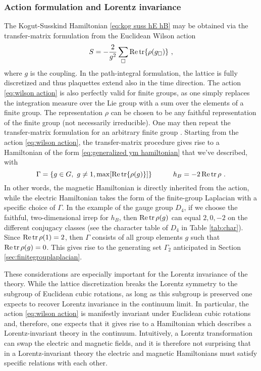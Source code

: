 \subsubsection{Action formulation and Lorentz invariance}\label{sec:action formulation}

The Kogut-Susskind Hamiltonian \eqref{eq:kog suss hE hB} may be obtained via the transfer-matrix formulation from the Euclidean Wilson action \cite{creutz1977transfermatrix,kogut1979introduction}
\begin{equation}
    \label{eq:wilson action}
    S = -\frac{2}{g^2} \sum_{\square} \Re \tr{\rho(g_\square)} \ ,
\end{equation}
where $g$ is the coupling.
In the path-integral formulation, the lattice is fully discretized and thus plaquettes extend also in the time direction.
The action \eqref{eq:wilson action} is also perfectly valid for finite groups, as one simply replaces the integration measure over the Lie group with a sum over the elements of a finite group. The representation $\rho$ can be chosen to be any faithful representation of the finite group (not necessarily irreducible).
One may then repeat the transfer-matrix formulation for an arbitrary finite group \cite{harlow2018quantum}.
Starting from the action \eqref{eq:wilson action}, the transfer-matrix procedure gives rise to a Hamiltonian of the form \eqref{eq:generalized ym hamiltonian} that we've described, with
\begin{equation}
    \label{eq:lorentz invariance relations}
    \Gamma = \{g \in G,\,\, g \neq 1, \mathrm{max} \bqty{\Re \tr{\rho(g)}}  \} \quad \quad \quad h_B=-2\Re\tr\rho \ .
\end{equation}
In other words, the magnetic Hamiltonian is directly inherited from the action, while the electric Hamiltonian takes the form of the finite-group Laplacian with a specific choice of $\Gamma$. In the example of the gauge group $D_4$, if we choose the faithful, two-dimensional irrep for $h_B$, then $\Re\tr\rho(g)$ can equal $2, 0, -2$ on the different conjugacy classes (see the character table of $D_4$ in Table \ref{tab:char}). Since $\Re\tr\rho(1)=2$, then $\Gamma$ consists of all group elements $g$ such that $\Re\tr\rho(g)=0$. This gives rise to the generating set $\Gamma_2$ anticipated in Section \ref{sec:finitegrouplaplacian}.

These considerations are especially important for the Lorentz invariance of the theory. While the lattice discretization breaks the Lorentz symmetry to the subgroup of Euclidean cubic rotations, as long as this subgroup is preserved one expects to recover Lorentz invariance in the continuum limit. In particular, the action \eqref{eq:wilson action} is manifestly invariant under Euclidean cubic rotations and, therefore, one expects that it gives rise to a  Hamiltonian which describes a Lorentz-invariant theory in the continuum. Intuitively, a Lorentz transformation can swap the electric and magnetic fields, and it is therefore not surprising that in a Lorentz-invariant theory the electric and magnetic Hamiltonians must satisfy specific relations with each other.

